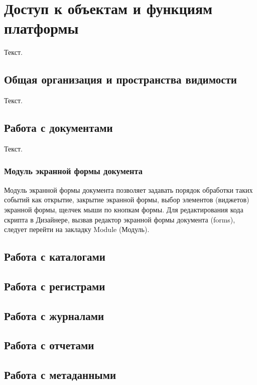 \documentclass[11pt,russian,a4paper]{article}
\begin{document}
\section{Доступ к объектам и функциям платформы}

Текст.

\subsection{Общая организация и пространства видимости}

Текст.

\subsection{Работа с документами}

Текст.

\subsubsection{Модуль экранной формы документа}

Модуль экранной формы документа позволяет задавать порядок обработки
таких событий как открытие, закрытие экранной формы,
выбор элементов (виджетов) экранной формы, щелчек мыши по кнопкам формы.
Для редактирования кода скрипта в Дизайнере, вызвав редактор
экранной формы документа (forms), следует перейти на закладку Module (Модуль).

\subsection{Работа с каталогами}


\subsection{Работа с регистрами}


\subsection{Работа с журналами}


\subsection{Работа с отчетами}


\subsection{Работа с метаданными}
\end{document}

